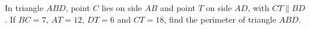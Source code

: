 In triangle $ABD$, point $C$ lies on side $AB$ and point $T$ on side $AD$, with $CT\parallel BD$. If $BC=7$, $AT=12$, $DT=6$ and $CT=18$, find the perimeter of triangle $ABD$.

